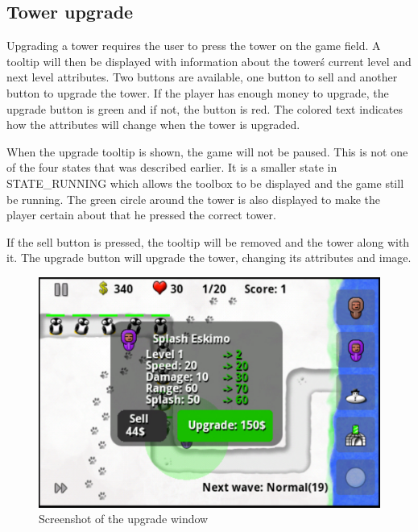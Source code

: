\clearpage

\subsection{Tower upgrade}

Upgrading a tower requires the user to press the tower on the game field. A tooltip will then be displayed with information about the tower\'s current level and next level attributes. Two buttons are available, one button to sell and another button to upgrade the tower. If the player has enough money to upgrade, the upgrade button is green and if not, the button is red. The colored text indicates how the attributes will change when the tower is upgraded.

When the upgrade tooltip is shown, the game will not be paused. This is not one of the four states that was described earlier. It is a smaller state in STATE\_RUNNING which allows the toolbox to be displayed and the game still be running. The green circle around the tower is also displayed to make the player certain about that he pressed the correct tower.  

If the sell button is pressed, the tooltip will be removed and the tower along with it. The upgrade button will upgrade the tower, changing its attributes and image.

\begin{figure}[here]
\begin{center}
\includegraphics[scale=0.6]{pics/chapters/chapter4/towerupgrade}
\end{center}
\caption{Screenshot of the upgrade window}
\label{fig:towerUpgrade}
\end{figure}

